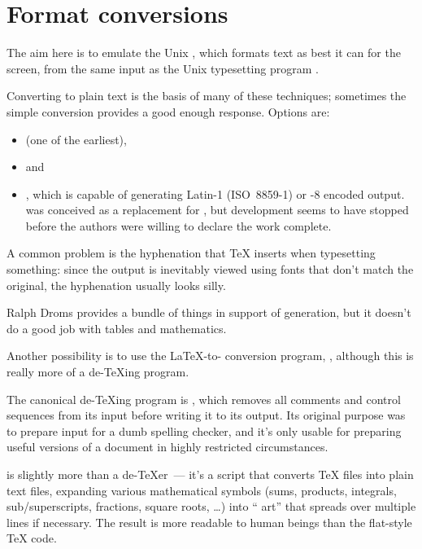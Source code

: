 
\section{Format conversions}


The aim here is to emulate the Unix , which formats
text as best it can for the screen, from the same
input as the Unix typesetting program .

Converting  to plain text is the basis of many of these
techniques; sometimes the simple conversion provides a good enough
response.  Options are:
\begin{itemize}
\item {} (one of the earliest),
\item {} and
\item {}, which is capable of generating Latin-1
  (ISO~8859-1) or -8 encoded output.   was
  conceived as a replacement for , but development
  seems to have stopped before the authors were willing to declare the
  work complete.
\end{itemize}
A common problem is the hyphenation that \TeX{} inserts when
typesetting something: since the output is inevitably viewed using
fonts that don't match the original, the hyphenation usually looks
silly.

Ralph Droms provides a  bundle of things in support of
 generation,
but it doesn't do a good job with tables and mathematics.

Another possibility is to
use the \LaTeX{}-to- conversion program, ,
although this is really more of a de-\TeX{}ing program.

The canonical de-\TeX{}ing program is , which removes
all comments and control sequences 
from its input before writing it to its output.  Its original purpose
was to prepare input for a dumb spelling checker, and it's only usable
for preparing useful  versions of a document in highly
restricted circumstances.

 is slightly more than a de-\TeX{}er~--- it's a
 script that converts \TeX{} files into
plain text files, expanding various mathematical symbols
(sums, products, integrals, sub/superscripts, fractions, square
roots, \dots{}\@) into `` art'' that spreads over
multiple lines if necessary. The result is more readable to human
beings than the flat-style \TeX{} code.

